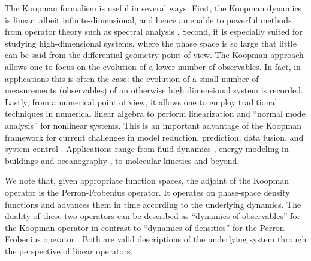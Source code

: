 \documentclass[%
 aip,
 cha,
 sd,%
 amsmath,amssymb,
 preprint,%
]{revtex4-1}
\begin{document}
The Koopman formalism is useful in several ways. First, the Koopman dynamics is linear, albeit infinite-dimensional, and hence amenable to powerful methods from operator theory such as spectral analysis \cite{neumann1932operatorenmethode,halmos1942operator,halmos1957introduction}. Second, it is especially suited for studying high-dimensional systems, where the phase space is so large that little can be said from the differential geometry point of view.
The Koopman approach allows one to focus on the evolution of a lower number of observables. In fact, in applications this is often the case: the evolution of a small number of measurements (observables) of an otherwise high dimensional system is recorded. Lastly, from a numerical point of view, it allows one to employ traditional techniques in numerical linear algebra to perform linearization and ``normal mode analysis'' for nonlinear systems. This is an important advantage of the Koopman framework for current challenges in model reduction, prediction, data fusion, and system control \cite{rowley2009spectral,budisic-2012,williams-2015b,giannakis-2015b,brunton-2016b,korda-2016}. Applications range from fluid dynamics \cite{mezic-2013,sharma-2016}, energy modeling in buildings \cite{georgescu-2015} and oceanography \cite{giannakis-2015b}, to molecular kinetics \cite{wu-2017} and beyond.

We note that, given appropriate function spaces, the adjoint of the Koopman operator is the Perron-Frobenius operator. It operates on phase-space density functions and advances them in time according to the underlying dynamics. The duality of these two operators can be described as ``dynamics of observables'' for the Koopman operator in contrast to ``dynamics of densities'' for the Perron-Frobenius operator \cite{budisic-2012}. Both are valid descriptions of the underlying system through the perspective of linear operators. 
\end{document}
